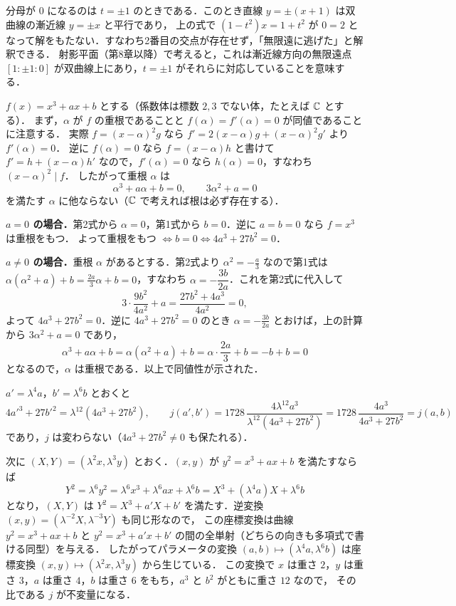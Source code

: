 分母が $0$ になるのは $t=\pm1$ のときである．このとき直線 $y=\pm(x+1)$ は双曲線の漸近線 $y=\pm x$ と平行であり，
上の式で $(1-t^2)x=1+t^2$ が $0=2$ となって解をもたない．すなわち2番目の交点が存在せず，「無限遠に逃げた」と解釈できる．
射影平面（第8章以降）で考えると，これは漸近線方向の無限遠点 $[1:\pm1:0]$ が双曲線上にあり，$t=\pm1$ がそれらに対応していることを意味する．

$f(x)=x^3+ax+b$ とする（係数体は標数 $2,3$ でない体，たとえば $\mathbb{C}$ とする）．
まず，$\alpha$ が $f$ の重根であることと $f(\alpha)=f'(\alpha)=0$ が同値であることに注意する．
実際 $f=(x-\alpha)^2g$ なら $f'=2(x-\alpha)g+(x-\alpha)^2g'$ より $f'(\alpha)=0$．
逆に $f(\alpha)=0$ なら $f=(x-\alpha)h$ と書けて $f'=h+(x-\alpha)h'$ なので，$f'(\alpha)=0$ なら $h(\alpha)=0$，すなわち $(x-\alpha)^2\mid f$．
したがって重根 $\alpha$ は
\[
  \alpha^3+a\alpha+b=0,\qquad 3\alpha^2+a=0
\]
を満たす $\alpha$ に他ならない（$\mathbb{C}$ で考えれば根は必ず存在する）．

\textbf{$a=0$ の場合．}第2式から $\alpha=0$，第1式から $b=0$．逆に $a=b=0$ なら $f=x^3$ は重根をもつ．
よって重根をもつ $\iff b=0\iff4a^3+27b^2=0$．

\textbf{$a\ne0$ の場合．}重根 $\alpha$ があるとする．第2式より $\alpha^2=-\frac a3$ なので第1式は
$\alpha(\alpha^2+a)+b=\frac{2a}3\alpha+b=0$，すなわち $\alpha=-\dfrac{3b}{2a}$．これを第2式に代入して
\[
  3\cdot\frac{9b^2}{4a^2}+a=\frac{27b^2+4a^3}{4a^2}=0,
\]
よって $4a^3+27b^2=0$．逆に $4a^3+27b^2=0$ のとき $\alpha=-\frac{3b}{2a}$ とおけば，上の計算から $3\alpha^2+a=0$ であり，
\[
  \alpha^3+a\alpha+b=\alpha(\alpha^2+a)+b=\alpha\cdot\frac{2a}3+b=-b+b=0
\]
となるので，$\alpha$ は重根である．以上で同値性が示された．

$a'=\lambda^4a$，$b'=\lambda^6b$ とおくと
\[
  4a'^3+27b'^2=\lambda^{12}(4a^3+27b^2),\qquad
  j(a',b')=1728\,\frac{4\lambda^{12}a^3}{\lambda^{12}(4a^3+27b^2)}=1728\,\frac{4a^3}{4a^3+27b^2}=j(a,b)
\]
であり，$j$ は変わらない（$4a^3+27b^2\ne0$ も保たれる）．

次に $(X,Y)=(\lambda^2x,\lambda^3y)$ とおく．$(x,y)$ が $y^2=x^3+ax+b$ を満たすならば
\[
  Y^2=\lambda^6y^2=\lambda^6x^3+\lambda^6ax+\lambda^6b=X^3+(\lambda^4a)X+\lambda^6b
\]
となり，$(X,Y)$ は $Y^2=X^3+a'X+b'$ を満たす．逆変換 $(x,y)=(\lambda^{-2}X,\lambda^{-3}Y)$ も同じ形なので，
この座標変換は曲線 $y^2=x^3+ax+b$ と $y^2=x^3+a'x+b'$ の間の全単射（どちらの向きも多項式で書ける同型）を与える．
したがってパラメータの変換 $(a,b)\mapsto(\lambda^4a,\lambda^6b)$ は座標変換 $(x,y)\mapsto(\lambda^2x,\lambda^3y)$ から生じている．
この変換で $x$ は重さ $2$，$y$ は重さ $3$，$a$ は重さ $4$，$b$ は重さ $6$ をもち，$a^3$ と $b^2$ がともに重さ $12$ なので，
その比である $j$ が不変量になる．

